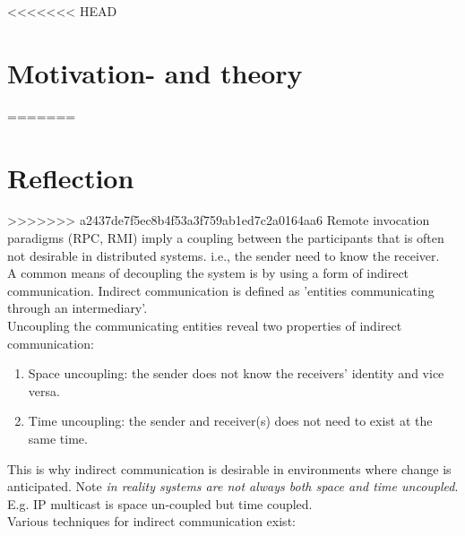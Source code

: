 <<<<<<< HEAD
\section{Motivation- and theory}
=======
\section{Reflection}
>>>>>>> a2437de7f5ec8b4f53a3f759ab1ed7c2a0164aa6
\label{jgroup_motivation}
Remote invocation paradigms (RPC, RMI) imply a coupling between the participants that is often not desirable in distributed systems. i.e., the sender need to know the receiver. \\

A common means of decoupling the system is by using a form of indirect communication. Indirect communication is defined as 'entities communicating through an intermediary'.\\
 
Uncoupling the communicating entities reveal two properties of indirect communication: 

\begin{enumerate}
\item Space uncoupling: the sender does not know the receivers' identity and vice versa. 
\item Time uncoupling: the sender and receiver(s) does not need to exist at the same time.  
\end{enumerate}

This is why indirect communication is desirable in environments where change is anticipated. Note \textit{in reality systems are not always both space and time uncoupled}. E.g. IP multicast is space un-coupled but time coupled. \\

Various techniques for indirect communication exist:\\


